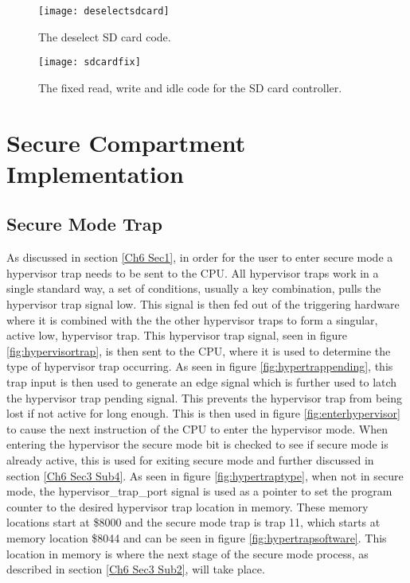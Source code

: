 \begin{figure}
  \centering
  \texttt{[image: deselectsdcard]}
  \caption{The deselect SD card code.}
  \label{fig:deselectsdcard}
\end{figure}

\begin{figure}
  \centering
  \texttt{[image: sdcardfix]}
  \caption{The fixed read, write and idle code for the SD card controller.}
  \label{fig:sdcardfix}
\end{figure}


\section{Secure Compartment Implementation}

\label{Ch6 Sec3}


\subsection{Secure Mode Trap}

\label{Ch6 Sec3 Sub1}

As discussed in section \ref{Ch6 Sec1}, in order for the user to enter secure mode a hypervisor trap needs to be sent to the CPU. All hypervisor traps work in a single standard way, a set of conditions, usually a key combination, pulls the hypervisor trap signal low. This signal is then fed out of the triggering hardware where it is combined with the the other hypervisor traps to form a singular, active low, hypervisor trap. This hypervisor trap signal, seen in figure \ref{fig:hypervisortrap}, is then sent to the CPU, where it is used to determine the type of hypervisor trap occurring. As seen in figure \ref{fig:hypertrappending}, this trap input is then used to generate an edge signal which is further used to latch the hypervisor trap pending signal. This prevents the hypervisor trap from being lost if not active for long enough. This is then used in figure \ref{fig:enterhypervisor} to cause the next instruction of the CPU to enter the hypervisor mode. When entering the hypervisor the secure mode bit is checked to see if secure mode is already active, this is used for exiting secure mode and further discussed in section \ref{Ch6 Sec3 Sub4}. As seen in figure \ref{fig:hypertraptype}, when not in secure mode, the hypervisor\_trap\_port signal is used as a pointer to set the program counter to the desired hypervisor trap location in memory. These memory locations start at \$8000 and the secure mode trap is trap 11, which starts at memory location \$8044 and can be seen in figure \ref{fig:hypertrapsoftware}. This location in memory is where the next stage of the secure mode process, as described in section \ref{Ch6 Sec3 Sub2}, will take place.

